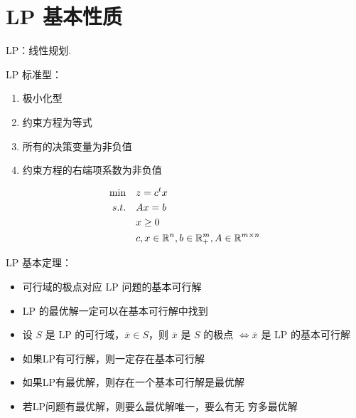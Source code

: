 \section{LP 基本性质}
LP：线性规划.

\begin{definition}
    LP 标准型：
    \begin{enumerate}
        \item 极小化型
        \item 约束方程为等式
        \item 所有的决策变量为非负值
        \item 约束方程的右端项系数为非负值
    \end{enumerate}
    \begin{align*}
        \min \quad &z = c^tx\\
        s.t. \quad &Ax = b\\
        &x \ge 0\\
        &c, x \in \mathbb{R}^n, b \in \mathbb{R}^m_+, A \in \mathbb{R}^{m \times n}
    \end{align*}
\end{definition}

\begin{note}
    LP 基本定理：
    \begin{itemize}
        \item 可行域的极点对应 LP 问题的基本可行解
        \item LP 的最优解一定可以在基本可行解中找到
        \item 设 $S$ 是 LP 的可行域，$\bar{x} \in S$，则 $\bar{x}$ 是 $S$ 的极点 $\Longleftrightarrow \bar{x}$ 是 LP 的基本可行解
        \item 如果LP有可行解，则一定存在基本可行解
        \item 如果LP有最优解，则存在一个基本可行解是最优解
        \item 若LP问题有最优解，则要么最优解唯一，要么有无
        穷多最优解
    \end{itemize}
\end{note}
